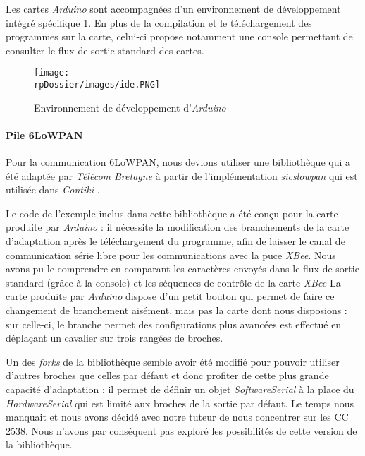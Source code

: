 Les cartes \emph{Arduino} sont accompagnées d’un environnement de développement intégré spécifique \cref{arduino-ide}.
En plus de la compilation et le téléchargement des programmes sur la carte, celui-ci propose notamment une console permettant de consulter le flux de sortie standard des cartes.

\begin{figure}[H]
\centering
\texttt{[image: \\rpDossier/images/ide.PNG]}
\caption{Environnement de développement d’\emph{Arduino}}
\label{arduino-ide}
\end{figure}

\paragraph{Pile 6LoWPAN}

Pour la communication 6LoWPAN, nous devions utiliser une bibliothèque qui a été adaptée par \emph{Télécom Bretagne} à partir de l’implémentation \emph{sicslowpan} qui est utilisée dans \emph{Contiki} .

Le code de l’exemple inclus dans cette bibliothèque a été conçu pour la carte produite par \emph{Arduino} : il nécessite la modification des branchements de la carte d’adaptation après le téléchargement du programme, afin de laisser le canal de communication série libre pour les communications avec la puce \emph{XBee}.
Nous avons pu le comprendre en comparant les caractères envoyés dans le flux de sortie standard (grâce à la console) et les séquences de contrôle de la carte \emph{XBee}
La carte produite par \emph{Arduino} dispose d’un petit bouton qui permet de faire ce changement de branchement aisément, mais pas la carte dont nous disposions : sur celle-ci, le branche permet des configurations plus avancées est effectué en déplaçant un cavalier sur trois rangées de broches.

Un des \textit{forks} de la bibliothèque  semble avoir été modifié pour pouvoir utiliser d’autres broches que celles par défaut et donc profiter de cette plus grande capacité d’adaptation : il permet de définir un objet \textit{SoftwareSerial} à la place du \textit{HardwareSerial} qui est limité aux broches de la sortie par défaut.
Le temps nous manquait et nous avons décidé avec notre tuteur de nous concentrer sur les CC 2538.
Nous n’avons par conséquent pas exploré les possibilités de cette version de la bibliothèque.


